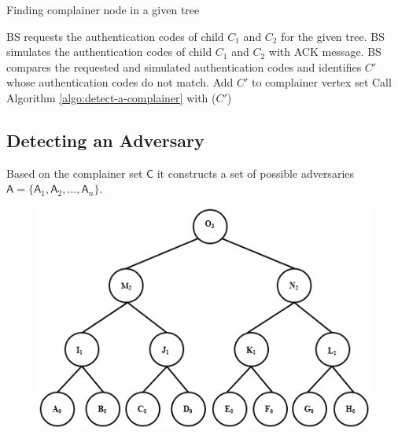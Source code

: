 \documentclass[%
  slidesonly,%
  semlayer%
  ]{seminar}                                  %
\begin{document}
\begin{slide}
        \begin{algorithm}
          \caption{Finding complainer node in a given tree}
          \label{algo:detect-a-complainer}
          \begin{algorithmic}[1]
            \STATE BS requests the authentication codes of child $C_{1}$ and $C_{2}$ for the given tree.
            \STATE BS simulates the authentication codes of child $C_{1}$ and $C_{2}$ with ACK message.
            \STATE BS compares the requested and simulated authentication codes and identifies $C'$ whose authentication codes do not match.
              \STATE Add $C'$ to complainer vertex set  
            \ELSE
              \STATE Call Algorithm \ref{algo:detect-a-complainer} with ($C'$)      
            \ENDIF
          \end{algorithmic}
        \end{algorithm}


        \vfill
        \clearpage

    \subsection*{Detecting an Adversary}
        \vfill
    
        Based on the complainer set $\textsf{C}$ it constructs a set of possible adversaries $\textsf{A} = \{\textsf{A}_{1},\textsf{A}_{2},\dotsc,\textsf{A}_{n}\}$. 

        \begin{figure}[t]
          \centering
          \includegraphics[scale=0.4]{images/possible-cheaters.png}
        \end{figure}


\end{slide}
\end{document}
